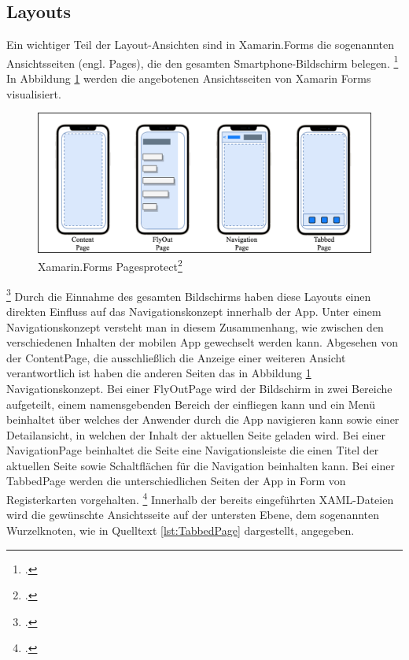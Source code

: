 \subsection{Layouts}
Ein wichtiger Teil der Layout-Ansichten sind in Xamarin.Forms die sogenannten Ansichtsseiten (engl. Pages),  die den gesamten Smartphone-Bildschirm belegen. \footcite[Vgl.][Abgerufen am \today]{MicrosoftXamPages2016} In Abbildung \ref{fig:Xamarin.Forms Pages} werden die angebotenen Ansichtsseiten von Xamarin Forms visualisiert. 
\begin{figure}[!ht]
 \includegraphics[width=\textwidth,height=\textheight,keepaspectratio]{Images/CrossPlattformFrameworks/XamarinFormsPages.png}
 \caption[Xamarin.Forms Pages]{Xamarin.Forms Pagesprotect\footcite{MicrosoftXamPages2016}}
 \label{fig:Xamarin.Forms Pages}
\end{figure}
\footcitetext[Abbildung in Anlehnung an ][Abgerufen am \today]{MicrosoftXamPages2016}
Durch die Einnahme des gesamten Bildschirms haben diese Layouts einen direkten Einfluss auf das Navigationskonzept innerhalb der App.  Unter einem Navigationskonzept versteht man in diesem Zusammenhang, wie zwischen den verschiedenen Inhalten der mobilen App gewechselt werden kann.  Abgesehen von der ContentPage,  die ausschließlich die Anzeige einer weiteren Ansicht verantwortlich ist haben die anderen Seiten das in Abbildung \ref{fig:Xamarin.Forms Pages} Navigationskonzept.  Bei einer \glq FlyOutPage\grq{} wird der Bildschirm in zwei Bereiche aufgeteilt, einem namensgebenden Bereich der einfliegen kann und ein Menü beinhaltet über welches der Anwender durch die App navigieren kann sowie einer Detailansicht,  in welchen der Inhalt der aktuellen Seite geladen wird.  Bei einer \glq NavigationPage\grq{} beinhaltet die Seite eine Navigationsleiste die einen Titel der aktuellen Seite sowie Schaltflächen für die Navigation beinhalten kann.  Bei einer \glq TabbedPage\grq{} werden die unterschiedlichen Seiten der App in Form von Registerkarten vorgehalten.  \footcite[Vgl.][Abgerufen am \today]{MicrosoftXamPages2016}
Innerhalb der bereits eingeführten XAML-Dateien wird die gewünschte Ansichtsseite auf der untersten Ebene,  dem sogenannten Wurzelknoten, wie in Quelltext \ref{lst:TabbedPage} dargestellt,  angegeben.  

